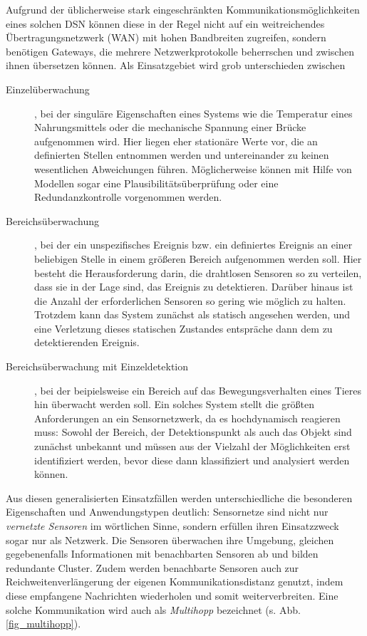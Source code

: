 Aufgrund der üblicherweise stark eingeschränkten Kommunikationsmöglichkeiten eines solchen \ac{DSN} können diese in der Regel nicht auf ein weitreichendes Übertragungsnetzwerk (\ac{WAN}) mit hohen Bandbreiten zugreifen, sondern benötigen Gateways, die mehrere Netzwerkprotokolle beherrschen und zwischen ihnen übersetzen können. Als Einsatzgebiet wird grob unterschieden zwischen
\begin{description}
	\item [Einzelüberwachung], bei der singuläre Eigenschaften eines Systems wie die Temperatur eines Nahrungsmittels oder die mechanische Spannung einer Brücke aufgenommen wird. Hier liegen eher stationäre Werte vor, die an definierten Stellen entnommen werden und untereinander zu keinen wesentlichen Abweichungen führen. Möglicherweise können mit Hilfe von Modellen sogar eine Plausibilitätsüberprüfung oder eine Redundanzkontrolle vorgenommen werden.
	\item[Bereichsüberwachung], bei der ein unspezifisches Ereignis bzw. ein definiertes Ereignis an einer beliebigen Stelle in einem größeren Bereich aufgenommen werden soll. Hier besteht die Herausforderung darin, die drahtlosen Sensoren so zu verteilen, dass sie in der Lage sind, das Ereignis zu detektieren. Darüber hinaus ist die Anzahl der erforderlichen Sensoren so gering wie möglich zu halten. Trotzdem kann das System zunächst als statisch angesehen werden, und eine Verletzung dieses statischen Zustandes entspräche dann dem zu detektierenden Ereignis.
	\item[Bereichsüberwachung mit Einzeldetektion], bei der beipielsweise ein Bereich auf das Bewegungsverhalten eines Tieres hin überwacht werden soll. Ein solches System stellt die größten Anforderungen an ein Sensornetzwerk, da es hochdynamisch reagieren muss: Sowohl der Bereich, der Detektionspunkt als auch das Objekt sind zunächst unbekannt und müssen aus der Vielzahl der Möglichkeiten erst identifiziert werden, bevor diese dann klassifiziert und analysiert werden können.
\end{description}

Aus diesen generalisierten Einsatzfällen werden unterschiedliche die besonderen Eigenschaften und Anwendungstypen deutlich: Sensornetze sind nicht nur \emph{vernetzte Sensoren} im wörtlichen Sinne, sondern erfüllen ihren Einsatzzweck sogar nur als Netzwerk. Die Sensoren überwachen ihre Umgebung, gleichen gegebenenfalls Informationen mit benachbarten Sensoren ab und bilden redundante Cluster. Zudem werden benachbarte Sensoren auch zur Reichweitenverlängerung der eigenen Kommunikationsdistanz genutzt, indem diese empfangene Nachrichten wiederholen und somit weiterverbreiten. Eine solche Kommunikation wird auch als \emph{Multihopp} bezeichnet (s. Abb. \ref{fig_multihopp}).

